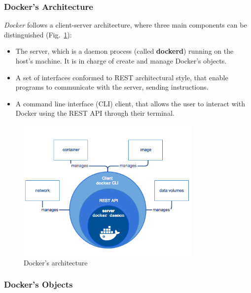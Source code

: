 \documentclass[a4paper,12pt]{article}
\def\myfig#1{Fig.~#1\xspace}
\begin{document}
\subsubsection{Docker's Architecture}

\textit{Docker} follows a client-server architecture, where three main
components can be distinguished (\myfig{\ref{fig:docker-architecture}}):
\begin{itemize}
  \item The server, which is a daemon process (called \textbf{dockerd}) running
  on the host's machine. It is in charge of create and manage Docker's objects.
  \item A set of interfaces conformed to REST architectural style, that enable
  programs to communicate with the server, sending instructions.
  \item A command line interface (CLI) client, that allows the user to interact
  with Docker using the REST API through their terminal. \cite{docker_architecture}
\end{itemize}   

\begin{figure}[ht!]
  \centerline{\includegraphics[width=0.8\textwidth]{engine-components-flow.png}}
  \caption{Docker's architecture}
  \label{fig:docker-architecture}
  \end{figure}

\subsubsection{Docker's Objects}
\label{sec:docker_object}
\end{document}
